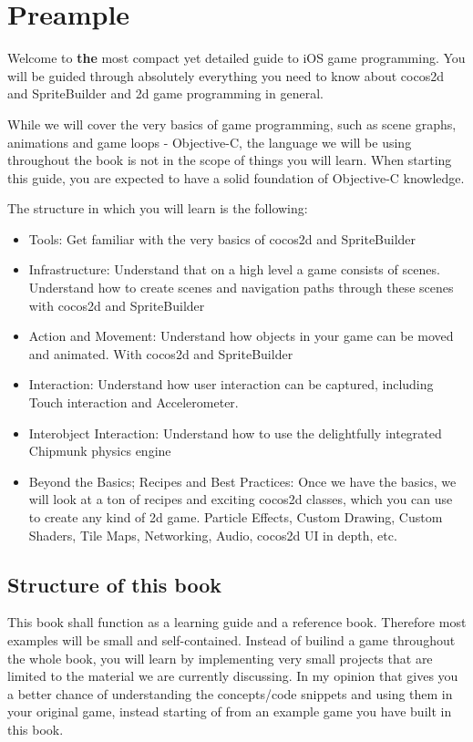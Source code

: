 \documentclass{scrreprt}
\newcommand{\cocos}{cocos2d}
\newcommand{\spriteb}{SpriteBuilder}
\begin{document}
\tableofcontents{}

\chapter{Preample}
Welcome to \textbf{the} most compact yet detailed guide to iOS game programming.
You will be guided through absolutely everything you need to know about
\cocos{} and \spriteb{} and 2d game programming in general.

While we will cover the very basics of game programming, such as scene graphs,
animations and game loops - Objective-C, the language we will be using
throughout the book is not in the scope of things you will learn. When starting
this guide, you are expected to have a solid foundation of Objective-C
knowledge.

The structure in which you will learn is the following:
\begin{itemize}
  \item Tools: Get familiar with the very basics of \cocos{} and \spriteb{}
  \item Infrastructure: Understand that on a high level a game consists of
  scenes. Understand how to create scenes and navigation paths through these
  scenes with \cocos{} and \spriteb{}
  \item Action and Movement: Understand how objects in your game can be moved
  and animated. With \cocos{} and \spriteb{}
  \item Interaction: Understand how user interaction can be captured, including
  Touch interaction and Accelerometer.
  \item Interobject Interaction: Understand how to use the delightfully
  integrated Chipmunk physics engine
  \item Beyond the Basics; Recipes and Best Practices:  Once we have the basics,
  we will look at a ton of recipes and exciting \cocos{} classes, which you can
  use to create any kind of 2d game. Particle Effects, Custom Drawing, Custom
  Shaders, Tile Maps, Networking, Audio, cocos2d UI in depth, etc.
\end{itemize}

\section{Structure of this book}
This book shall function as a learning guide and a reference book. Therefore
most examples will be small and self-contained. Instead of builind a game
throughout the whole book, you will learn by implementing very small projects
that are limited to the material we are currently discussing. 
In my opinion that gives you a better chance of understanding the concepts/code
snippets and using them in your original game, instead starting of from an
example game you have built in this book.
\end{document}
